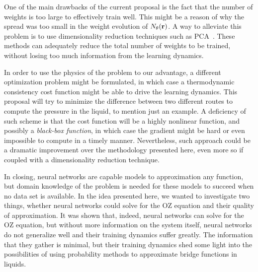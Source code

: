 One of the main drawbacks of the current proposal is the fact that the number of weights
is too large to effectively train well. This might be a reason of why the spread was
too small in the weight evolution of $N_{\theta}(\mathbf{r})$. A way to alleviate this problem is to use
dimensionality reduction techniques such as
PCA~\cite{hastieElementsStatisticalLearning2009}. These methods can adequately reduce the
total number of weights to be trained, without losing too much information from the learning
dynamics.

In order to use the physics of the problem to our advantage, a different optimization
problem might be formulated, in which case a thermodynamic consistency cost function
might be able to drive the learning dynamics. This proposal will try to minimize the 
difference between two different routes to compute the pressure in the liquid, to
mention just an example. A deficiency of such scheme is that the cost function will be
a highly nonlinear function, and possibly a \emph{black-box function}, in which case
the gradient might be hard or even impossible to compute in a timely manner.
Nevertheless, such approach could be a dramatic improvement over the methodology presented
here, even more so if coupled with a dimensionality reduction technique.

In closing, neural networks are capable models to approximation any function, but domain
knowledge of the problem is needed for these models to succeed when no data set is 
available. In the idea presented here, we wanted to investigate two things, whether neural
networks could solve for the OZ equation and their quality of approximation. It was shown
that, indeed, neural networks can solve for the OZ equation, but without more information
on the system itself, neural networks do not generalize well and their training dynamics
suffer greatly. The information that they gather is minimal, but their training dynamics
shed some light into the possibilities of using probability methods to approximate
bridge functions in liquids.